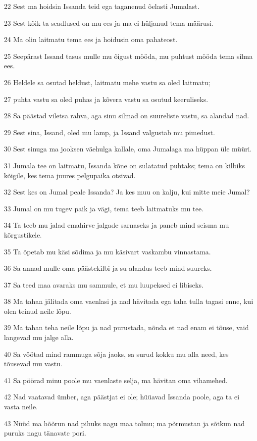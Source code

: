 \par 22 Sest ma hoidsin Issanda teid ega taganenud õelasti Jumalast.
\par 23 Sest kõik ta seadlused on mu ees ja ma ei hüljanud tema määrusi.
\par 24 Ma olin laitmatu tema ees ja hoidusin oma pahateost.
\par 25 Seepärast Issand tasus mulle mu õigust mööda, mu puhtust mööda tema silma ees.
\par 26 Heldele sa osutad heldust, laitmatu mehe vastu sa oled laitmatu;
\par 27 puhta vastu sa oled puhas ja kõvera vastu sa osutud keeruliseks.
\par 28 Sa päästad viletsa rahva, aga sinu silmad on suureliste vastu, sa alandad nad.
\par 29 Sest sina, Issand, oled mu lamp, ja Issand valgustab mu pimedust.
\par 30 Sest sinuga ma jooksen väehulga kallale, oma Jumalaga ma hüppan üle müüri.
\par 31 Jumala tee on laitmatu, Issanda kõne on sulatatud puhtaks; tema on kilbiks kõigile, kes tema juures pelgupaika otsivad.
\par 32 Sest kes on Jumal peale Issanda? Ja kes muu on kalju, kui mitte meie Jumal?
\par 33 Jumal on mu tugev paik ja vägi, tema teeb laitmatuks mu tee.
\par 34 Ta teeb mu jalad emahirve jalgade sarnaseks ja paneb mind seisma mu kõrgustikele.
\par 35 Ta õpetab mu käsi sõdima ja mu käsivart vaskambu vinnastama.
\par 36 Sa annad mulle oma päästekilbi ja su alandus teeb mind suureks.
\par 37 Sa teed maa avaraks mu sammule, et mu luupeksed ei libiseks.
\par 38 Ma tahan jälitada oma vaenlasi ja nad hävitada ega taha tulla tagasi enne, kui olen teinud neile lõpu.
\par 39 Ma tahan teha neile lõpu ja nad purustada, nõnda et nad enam ei tõuse, vaid langevad mu jalge alla.
\par 40 Sa vöötad mind rammuga sõja jaoks, sa surud kokku mu alla need, kes tõusevad mu vastu.
\par 41 Sa pöörad minu poole mu vaenlaste selja, ma hävitan oma vihamehed.
\par 42 Nad vaatavad ümber, aga päästjat ei ole; hüüavad Issanda poole, aga ta ei vasta neile.
\par 43 Nüüd ma hõõrun nad pihuks nagu maa tolmu; ma põrmustan ja sõtkun nad puruks nagu tänavate pori.
